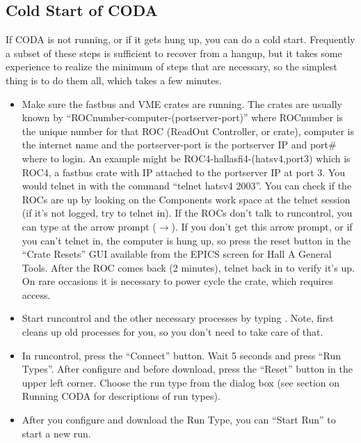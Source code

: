 {{\subsection{ Cold Start of CODA}

\par
If CODA is not running, or if it gets hung up,
you can do a cold start.  Frequently a subset of
these steps is sufficient to recover from a hangup,
but it takes some experience to realize the
minimum of steps that
are necessary, so the simplest
thing is to do them all, which takes a few minutes.

\begin{itemize}
\item{Make sure the fastbus and VME crates are
running.  The crates are usually known by
``ROCnumber-computer-(portserver-port)''
where ROCnumber is the unique number for that
ROC (ReadOut Controller, or crate),
computer is the internet name and the
portserver-port is the portserver IP and port\#
where to login.
An example might be \hskip 0.05in
ROC4-hallasfi4-(hatsv4,port3) which is
ROC4, a fastbus crate with IP  attached
to the portserver IP  at port 3.
You would telnet in with the command ``telnet hatsv4 2003''.
You can check if the ROCs
are up by looking on the Components work space
at the telnet session (if it's not logged,
try to telnet in).
If the ROCs don't talk to runcontrol, you can type
 at the arrow prompt ($\rightarrow$).   If you
don't get this arrow prompt, or if you can't telnet in,
the computer is hung up, so press
the reset button in the ``Crate Resets'' GUI
available from the EPICS screen for
Hall A General Tools.
After the ROC comes back (2 minutes),
telnet back in to verify it's up.
On rare occasions it is necessary to
power cycle the crate, which requires access. }
\item{ Start runcontrol and the other necessary
processes by typing .  Note,
 first cleans up old processes
for you, so you don't need to take care of that.}
\item{ In runcontrol,
press the ``Connect'' button.
Wait 5 seconds and press ``Run Types''.
After configure and before download,
press the ``Reset'' button in the upper left corner.
Choose the run type from the dialog box
(see section on Running
CODA for descriptions of run types).}
\item{ After you configure and download the Run Type,
you can ``Start Run'' to start a new run.}



\end{itemize}}}
